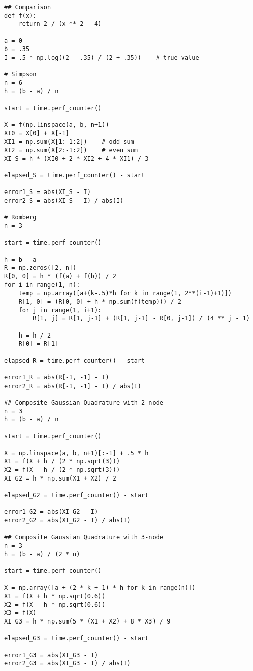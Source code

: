 \documentclass[preprint,12pt]{elsarticle}
\begin{document}
\begin{lstlisting}
## Comparison
def f(x):
    return 2 / (x ** 2 - 4)

a = 0
b = .35
I = .5 * np.log((2 - .35) / (2 + .35))    # true value

# Simpson
n = 6
h = (b - a) / n

start = time.perf_counter()

X = f(np.linspace(a, b, n+1))
XI0 = X[0] + X[-1]
XI1 = np.sum(X[1:-1:2])    # odd sum
XI2 = np.sum(X[2:-1:2])    # even sum
XI_S = h * (XI0 + 2 * XI2 + 4 * XI1) / 3

elapsed_S = time.perf_counter() - start

error1_S = abs(XI_S - I)
error2_S = abs(XI_S - I) / abs(I)

# Romberg
n = 3

start = time.perf_counter()

h = b - a
R = np.zeros([2, n])
R[0, 0] = h * (f(a) + f(b)) / 2
for i in range(1, n):
    temp = np.array([a+(k-.5)*h for k in range(1, 2**(i-1)+1)])
    R[1, 0] = (R[0, 0] + h * np.sum(f(temp))) / 2
    for j in range(1, i+1):
        R[1, j] = R[1, j-1] + (R[1, j-1] - R[0, j-1]) / (4 ** j - 1)
    
    h = h / 2
    R[0] = R[1]

elapsed_R = time.perf_counter() - start

error1_R = abs(R[-1, -1] - I)
error2_R = abs(R[-1, -1] - I) / abs(I)

## Composite Gaussian Quadrature with 2-node
n = 3
h = (b - a) / n

start = time.perf_counter()

X = np.linspace(a, b, n+1)[:-1] + .5 * h
X1 = f(X + h / (2 * np.sqrt(3)))
X2 = f(X - h / (2 * np.sqrt(3)))
XI_G2 = h * np.sum(X1 + X2) / 2

elapsed_G2 = time.perf_counter() - start

error1_G2 = abs(XI_G2 - I)
error2_G2 = abs(XI_G2 - I) / abs(I)

## Composite Gaussian Quadrature with 3-node
n = 3
h = (b - a) / (2 * n)

start = time.perf_counter()

X = np.array([a + (2 * k + 1) * h for k in range(n)])
X1 = f(X + h * np.sqrt(0.6))
X2 = f(X - h * np.sqrt(0.6))
X3 = f(X)
XI_G3 = h * np.sum(5 * (X1 + X2) + 8 * X3) / 9

elapsed_G3 = time.perf_counter() - start

error1_G3 = abs(XI_G3 - I)
error2_G3 = abs(XI_G3 - I) / abs(I)


\end{lstlisting}
\end{document}
